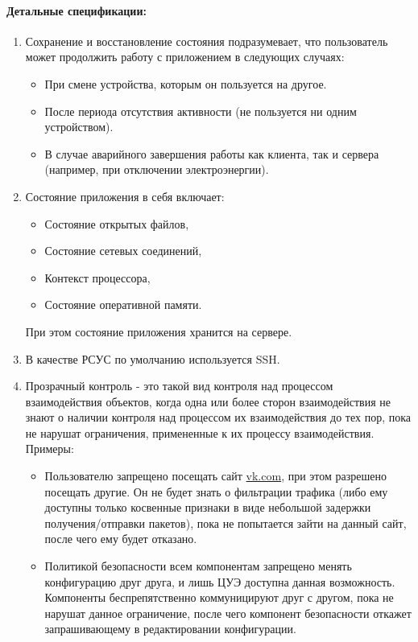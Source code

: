 \paragraph*{Детальные спецификации:}
\begin{enumerate}[label={\bfseriesДС-\arabic*.}]
   \item Сохранение и восстановление состояния подразумевает, что пользователь может продолжить работу с приложением в следующих случаях:
         \begin{itemize}
            \item При смене устройства, которым он пользуется на другое.
            \item После периода отсутствия активности (не пользуется ни одним устройством).
            \item В случае аварийного завершения работы как клиента, так и сервера (например, при отключении электроэнергии).
         \end{itemize}
         \label{DS-appstate_switch}
   \item Состояние приложения в себя включает:
         \begin{itemize}
            \item Состояние открытых файлов,
            \item Состояние сетевых соединений,
            \item Контекст процессора,
            \item Состояние оперативной памяти.
         \end{itemize}
         При этом состояние приложения хранится на сервере.
         \label{DS-appstate-description}
   \item В качестве РСУС по умолчанию используется SSH. \label{DS-remote_access_default}
   \item Прозрачный контроль - это такой вид контроля над процессом взаимодействия объектов, когда одна или более сторон взаимодействия не знают о наличии контроля над процессом их взаимодействия до тех пор, пока не нарушат ограничения, примененные к их процессу взаимодействия. Примеры: \label{DS-transparent-control}
         \begin{itemize}
            \item Пользователю запрещено посещать сайт \url{vk.com}, при этом разрешено посещать другие. Он не будет знать о фильтрации трафика (либо ему доступны только косвенные признаки в виде небольшой задержки получения/отправки пакетов), пока не попытается зайти на данный сайт, после чего ему будет отказано.
            \item Политикой безопасности всем компонентам запрещено менять конфигурацию друг друга, и лишь ЦУЭ доступна данная возможность. Компоненты беспрепятственно коммуницируют друг с другом, пока не нарушат данное ограничение, после чего компонент безопасности откажет запрашивающему в редактировании конфигурации.
         \end{itemize}
\end{enumerate}
